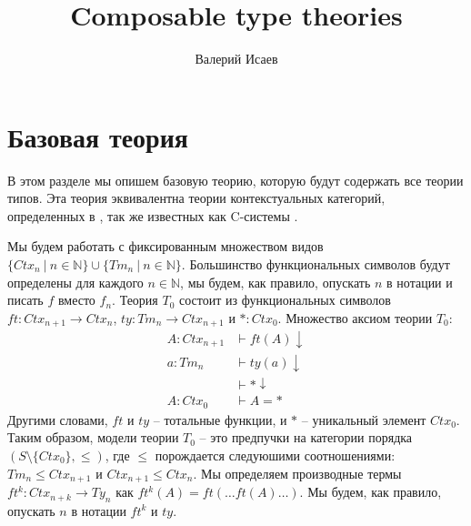 \documentclass{amsart}
\theoremstyle{definition}
\theoremstyle{remark}
\numberwithin{figure}{section}
\begin{document}
\title{Composable type theories}

\author{Валерий Исаев}


\maketitle

\section{Базовая теория}

В этом разделе мы опишем базовую теорию, которую будут содержать все теории типов.
Эта теория эквивалентна теории контекстуальных категорий, определенных в \cite{GAT}, так же известных как C-системы \cite{c-systems}.

Мы будем работать с фиксированным множеством видов $\{ Ctx_n\ |\ n \in \mathbb{N} \} \cup \{ Tm_n\ |\ n \in \mathbb{N} \}$.
Большинство функциональных символов будут определены для каждого $n \in \mathbb{N}$, мы будем, как правило, опускать $n$ в нотации и писать $f$ вместо $f_n$.
Теория $T_0$ состоит из функциональных символов $ft : Ctx_{n+1} \to Ctx_n$, $ty : Tm_n \to Ctx_{n+1}$ и $* : Ctx_0$.
Множество аксиом теории $T_0$:
\begin{align*}
A : Ctx_{n+1} & \vdash ft(A) \downarrow \\
a : Tm_n & \vdash ty(a) \downarrow \\
& \vdash * \downarrow \\
A : Ctx_0 & \vdash A = *
\end{align*}
Другими словами, $ft$ и $ty$ -- тотальные функции, и $*$ -- уникальный элемент $Ctx_0$.
Таким образом, модели теории $T_0$ -- это предпучки на категории порядка $(S \setminus \{ Ctx_0 \}, \leq)$, где $\leq$ порождается следуюшими соотношениями: $Tm_n \leq Ctx_{n+1}$ и $Ctx_{n+1} \leq Ctx_n$.
Мы определяем производные термы $ft^k : Ctx_{n+k} \to Ty_n$ как $ft^k(A) = ft( \ldots ft(A) \ldots )$.
Мы будем, как правило, опускать $n$ в нотации $ft^k$ и $ty$.
\end{document}
